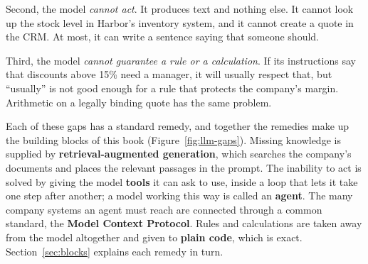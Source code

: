 Second, the model \emph{cannot act}. It produces text and nothing else. It cannot look up the stock level in Harbor's inventory system, and it cannot create a quote in the CRM. At most, it can write a sentence saying that someone should.

Third, the model \emph{cannot guarantee a rule or a calculation}. If its instructions say that discounts above 15\% need a manager, it will usually respect that, but ``usually'' is not good enough for a rule that protects the company's margin. Arithmetic on a legally binding quote has the same problem.

Each of these gaps has a standard remedy, and together the remedies make up the building blocks of this book (Figure~\ref{fig:llm-gaps}). Missing knowledge is supplied by \textbf{retrieval-augmented generation}, which searches the company's documents and places the relevant passages in the prompt. The inability to act is solved by giving the model \textbf{tools} it can ask to use, inside a loop that lets it take one step after another; a model working this way is called an \textbf{agent}. The many company systems an agent must reach are connected through a common standard, the \textbf{Model Context Protocol}. Rules and calculations are taken away from the model altogether and given to \textbf{plain code}, which is exact. Section~\ref{sec:blocks} explains each remedy in turn.

